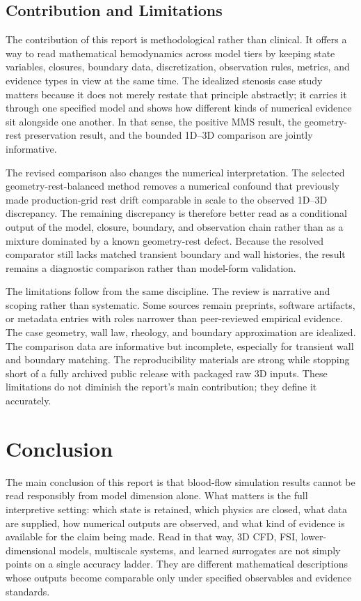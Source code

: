 \subsection{Contribution and Limitations}
\label{subsec:discussion-contribution-limitations}

The contribution of this report is methodological rather than clinical. It
offers a way to read mathematical hemodynamics across model tiers by keeping
state variables, closures, boundary data, discretization, observation rules,
metrics, and evidence types in view at the same time. The idealized stenosis
case study matters because it does not merely restate that principle
abstractly; it carries it through one specified model and shows how different
kinds of numerical evidence sit alongside one another. In that sense, the
positive MMS result, the geometry-rest preservation result, and the bounded
1D--3D comparison are jointly informative.

The revised comparison also changes the numerical interpretation. The selected
geometry-rest-balanced method removes a numerical confound that previously made
production-grid rest drift comparable in scale to the observed 1D--3D
discrepancy. The remaining discrepancy is therefore better read as a
conditional output of the model, closure, boundary, and observation chain
rather than as a mixture dominated by a known geometry-rest defect. Because the
resolved comparator still lacks matched transient boundary and wall histories,
the result remains a diagnostic comparison rather than model-form validation.

The limitations follow from the same discipline. The review is narrative and
scoping rather than systematic. Some sources remain preprints, software
artifacts, or metadata entries with roles narrower than peer-reviewed empirical
evidence. The case geometry, wall law, rheology, and boundary approximation are
idealized. The comparison data are informative but incomplete, especially for
transient wall and boundary matching. The reproducibility materials are strong
while stopping short of a fully archived public release with packaged raw 3D
inputs. These limitations do not diminish the report's main contribution; they
define it accurately.

\section{Conclusion}
\label{sec:conclusions-limitations}

The main conclusion of this report is that blood-flow simulation results cannot
be read responsibly from model dimension alone. What matters is the full
interpretive setting: which state is retained, which physics are closed, what
data are supplied, how numerical outputs are observed, and what kind of
evidence is available for the claim being made. Read in that way, 3D CFD, FSI,
lower-dimensional models, multiscale systems, and learned surrogates are not
simply points on a single accuracy ladder. They are different mathematical
descriptions whose outputs become comparable only under specified observables
and evidence standards.

